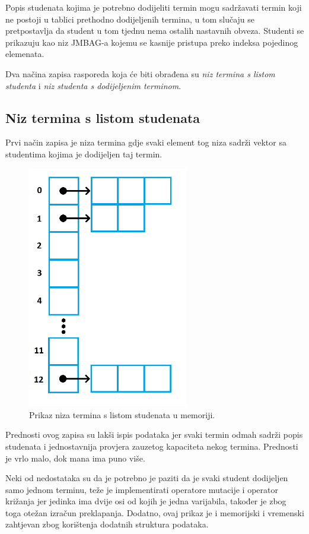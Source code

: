\documentclass[times, utf8, zavrsni]{fer}
\begin{document}
Popis studenata kojima je potrebno dodijeliti termin mogu sadržavati termin koji ne postoji u tablici prethodno dodijeljenih termina, u tom slučaju se pretpostavlja da student u tom tjednu nema ostalih nastavnih obveza. Studenti se prikazuju kao niz JMBAG-a kojemu se kasnije pristupa preko indeksa pojedinog elemenata.

Dva načina zapisa rasporeda koja će biti obrađena su \emph{niz termina s listom studenta} i \emph{niz studenta s dodijeljenim terminom}.

\subsection{Niz termina s listom studenata}

Prvi način zapisa je niza termina gdje svaki element tog niza sadrži vektor sa studentima kojima je dodijeljen taj termin.

\begin{figure}[htb]
\centering
\includegraphics[width=7cm]{images/prikaz_jednike_1.png}
\caption{Prikaz niza termina s listom studenata u memoriji.}
\label{fig:prikaz_jednike_1}
\end{figure}

Prednosti ovog zapisa su lakši ispis podataka jer svaki termin odmah sadrži popis studenata i jednostavnija provjera zauzetog kapaciteta nekog termina. Prednosti je vrlo malo, dok mana ima puno više.

Neki od nedostataka su da je potrebno je paziti da je svaki student dodijeljen samo jednom terminu, teže je implementirati operatore mutacije i operator križanja jer jedinka ima dvije osi od kojih je jedna varijabila, također je zbog toga otežan izračun preklapanja. Dodatno, ovaj prikaz je i memorijski i vremenski zahtjevan zbog korištenja dodatnih struktura podataka.
\end{document}
